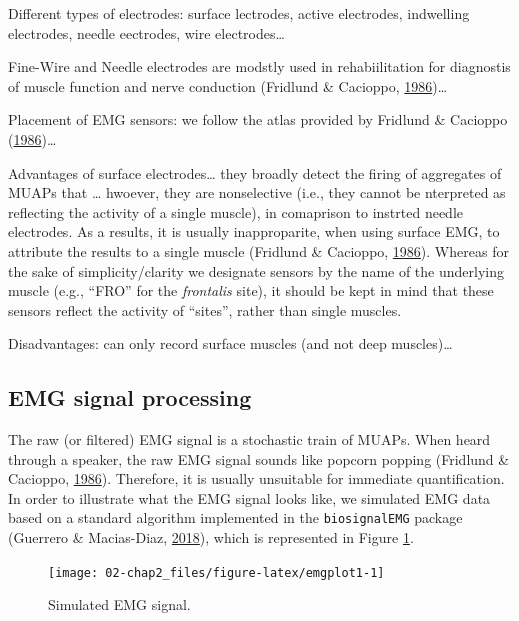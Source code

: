 \documentclass[a4paper,12pt,twoside,openright,oldfontcommands]{memoir}
\begin{document}
Different types of electrodes: surface lectrodes, active electrodes,
indwelling electrodes, needle eectrodes, wire electrodes\ldots{}

Fine-Wire and Needle electrodes are modstly used in rehabiilitation for
diagnostis of muscle function and nerve conduction (Fridlund \&
Cacioppo,
\protect\hyperlink{ref-fridlund_guidelines_1986}{1986})\ldots{}

Placement of EMG sensors: we follow the atlas provided by Fridlund \&
Cacioppo
(\protect\hyperlink{ref-fridlund_guidelines_1986}{1986})\ldots{}

Advantages of surface electrodes\ldots{} they broadly detect the firing
of aggregates of MUAPs that \ldots{} hwoever, they are nonselective
(i.e., they cannot be nterpreted as reflecting the activity of a single
muscle), in comaprison to instrted needle electrodes. As a results, it
is usually inapproparite, when using surface EMG, to attribute the
results to a single muscle (Fridlund \& Cacioppo,
\protect\hyperlink{ref-fridlund_guidelines_1986}{1986}). Whereas for the
sake of simplicity/clarity we designate sensors by the name of the
underlying muscle (e.g., ``FRO'' for the \emph{frontalis} site), it
should be kept in mind that these sensors reflect the activity of
``sites'', rather than single muscles.

Disadvantages: can only record surface muscles (and not deep
muscles)\ldots{}

\subsection{EMG signal processing}\label{emg-signal-processing}

The raw (or filtered) EMG signal is a stochastic train of MUAPs. When
heard through a speaker, the raw EMG signal sounds like popcorn popping
(Fridlund \& Cacioppo,
\protect\hyperlink{ref-fridlund_guidelines_1986}{1986}). Therefore, it
is usually unsuitable for immediate quantification. In order to
illustrate what the EMG signal looks like, we simulated EMG data based
on a standard algorithm implemented in the \texttt{biosignalEMG} package
(Guerrero \& Macias-Diaz, \protect\hyperlink{ref-R-biosignalEMG}{2018}),
which is represented in Figure \ref{fig:emgplot1}.

\begin{figure}[H]

{\centering \texttt{[image: 02-chap2\_files/figure-latex/emgplot1-1]} 

}

\caption{Simulated EMG signal.}\label{fig:emgplot1}
\end{figure}
\end{document}
